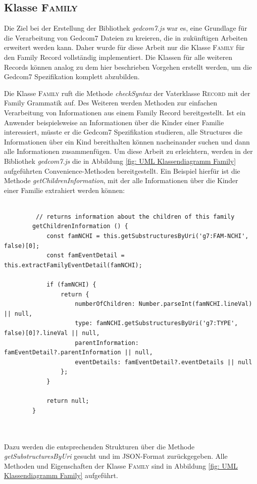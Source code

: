 \subsection{Klasse \textsc{Family}}
Die Ziel bei der Erstellung der Bibliothek \textit{gedcom7.js} war es, eine Grundlage für die Verarbeitung von Gedcom7 Dateien zu kreieren, die in zukünftigen Arbeiten erweitert werden kann. Daher wurde für diese Arbeit nur die Klasse \textsc{Family} für den Family Record vollständig implementiert. Die Klassen für alle weiteren Records können analog zu dem hier beschrieben Vorgehen erstellt werden, um die Gedcom7 Spezifikation komplett abzubilden. 


Die Klasse \textsc{Family} ruft die Methode \textit{checkSyntax} der Vaterklasse \textsc{Record} mit der Family Grammatik auf. Des Weiteren werden Methoden zur einfachen Verarbeitung von Informationen aus einem Family Record bereitgestellt. Ist ein Anwender beispielsweise an Informationen über die Kinder einer Familie interessiert, müsste er die Gedcom7 Spezifikation studieren, alle Structures die Informationen über ein Kind bereithalten können nacheinander suchen und dann alle Informationen zusammenfügen. Um diese Arbeit zu erleichtern, werden in der Bibliothek \textit{gedcom7.js} die in Abbildung \ref{fig: UML Klassendiagramm Family} aufgeführten Convenience-Methoden bereitgestellt. Ein Beispiel hierfür ist die Methode \textit{getChildrenInformation}, mit der alle Informationen über die Kinder einer Familie extrahiert werden können:
\\ \\
\begin{minipage}{1.0\textwidth} \small
	\begin{lstlisting}
		 // returns information about the children of this family
		getChildrenInformation () {
			const famNCHI = this.getSubstructuresByUri('g7:FAM-NCHI', false)[0];
			const famEventDetail = this.extractFamilyEventDetail(famNCHI);
			
			if (famNCHI) {
				return {
					numberOfChildren: Number.parseInt(famNCHI.lineVal) || null,
					type: famNCHI.getSubstructuresByUri('g7:TYPE', false)[0]?.lineVal || null,
					parentInformation: famEventDetail?.parentInformation || null,
					eventDetails: famEventDetail?.eventDetails || null
				};
			}
			
			return null;
		}
	\end{lstlisting}
	\label{lst: extractIdentifier Funktion}
\end{minipage}
\\ \\
Dazu werden die entsprechenden Strukturen über die Methode \textit{getSubstructuresByUri} gesucht und im JSON-Format zurückgegeben. Alle Methoden und Eigenschaften der Klasse \textsc{Family} sind in Abbildung \ref{fig: UML Klassendiagramm Family} aufgeführt.

